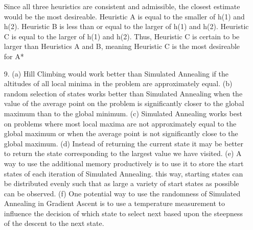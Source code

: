 \documentclass{article}
\begin{document}
\begin{enumerate}
Since all three heuristics are consistent and admissible, the closest estimate would be the most desireable. Heuristic A is equal to the smaller of h(1) and h(2). Heuristic B is less than or equal to the larger of h(1) and h(2). Heuristic C is equal to the larger of h(1) and h(2). Thus, Heuristic C is certain to be larger than Heuristics A and B, meaning Heuristic C is the most desireable for A*

\item[9.] 
(a) Hill Climbing would work better than Simulated Annealing if the altitudes of all local minima in the problem are approximately equal.
(b) random selection of states works better than Simulated Annealing when the value of the average point on the problem is significantly closer to the global maximum than to the global minimum. 
(c) Simulated Annealing works best on problems where most local maxima are not approximately equal to the global maximum or when the average point is not significantly close to the global maximum.  
(d) Instead of returning the current state it may be better to return the state corresponding to the largest value we have visited. 
(e) A way to use the additional memory productively is to use it to store the start states of each iteration of Simulated Annealing. this way, starting states can be distributed evenly such that as large a variety of start states as possible can be observed.
(f) One potential way to use the randomness of Simulated Annealing in Gradient Ascent is to use a temperature measurement to influence the decision of which state to select next based upon the steepness of the descent to the next state. 
\end{enumerate}
\end{document}
